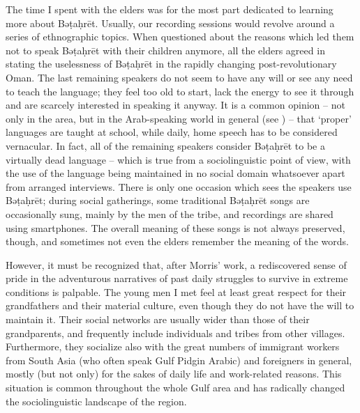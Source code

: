 \documentclass[output=paper]{langscibook}
\begin{document}
The time I spent with the elders was for the most part dedicated to learning more about Bəṭaḥrēt. Usually, our recording sessions would revolve around a series of ethnographic topics. When questioned about the reasons which led them not to speak Bəṭaḥrēt with their children anymore, all the elders agreed in stating the uselessness of Bəṭaḥrēt in the rapidly changing post-revolutionary Oman. The last remaining speakers do not seem to have any will or see any need to teach the language; they feel too old to start, lack the energy to see it through and are scarcely interested in speaking it anyway. It is a common opinion – not only in the area, but in the Arab-speaking world in general (see \cite{kaye_diglossia_2001}) – that ‘proper' languages are taught at school, while daily, home speech has to be considered vernacular. In fact, all of the remaining speakers consider Bəṭaḥrēt to be a virtually dead language – which is true from a sociolinguistic point of view, with the use of the language being maintained in no social domain whatsoever apart from arranged interviews. There is only one occasion which sees the speakers use Bəṭaḥrēt; during social gatherings, some traditional Bəṭaḥrēt songs are occasionally sung, mainly by the men of the tribe, and recordings are shared using smartphones. The overall meaning of these songs is not always preserved, though, and sometimes not even the elders remember the meaning of the words. 

However, it must be recognized that, after Morris’ work, a rediscovered sense of pride in the adventurous narratives of past daily struggles to survive in extreme conditions is palpable. The young men I met feel at least great respect for their grandfathers and their material culture, even though they do not have the will to maintain it. Their social networks are usually wider than those of their grandparents, and frequently include individuals and tribes from other villages. Furthermore, they socialize also with the great numbers of immigrant workers from South Asia (who often speak Gulf Pidgin Arabic) and foreigners in general, mostly (but not only) for the sakes of daily life and work-related reasons. This situation is common throughout the whole Gulf area \citep[137]{holes_language_2011} and has radically changed the sociolinguistic landscape of the region. 
\end{document}
